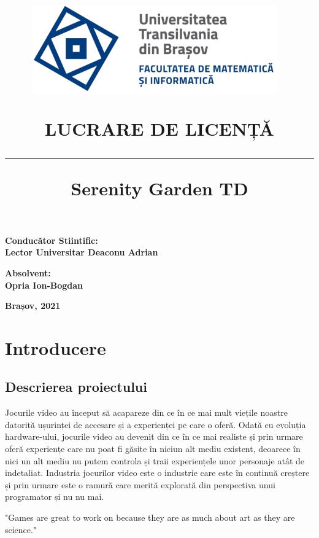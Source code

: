 \documentclass[12pt, a4paper]{article}
\title{%
	\includegraphics[height=0.3\textwidth]{UNITBV2.png}~ 
	\\[1cm]
	\vspace{20mm}
	
	\bf 	LUCRARE DE LICENȚĂ
	\noindent\rule{14cm}{1pt}
	\bf Serenity Garden TD
}
\date{}
\begin{document}
	
	
	
	\maketitle
	\vspace{10mm} %
	\begin{flushleft}
		\bf 	Conducător Stiintific:
		\bf     \\Lector Universitar Deaconu Adrian
	\end{flushleft}
	
	\begin{flushright}
		\bf Absolvent:
		\bf \\Opria Ion-Bogdan
	\end{flushright}
	
	\vspace{6mm} %
	
	\begin{center}
		\bf Brașov, 2021 
	\end{center}
	
	
	\tableofcontents
	\pagebreak
	
	\section{Introducere}
	
	
	
	
	
	\subsection{Descrierea proiectului}
	
	Jocurile video au început să acapareze din ce în ce mai mult viețile noastre datorită ușurinței de accesare și a experienței pe care o oferă. Odată cu evoluția hardware-ului, jocurile video au devenit din ce în ce mai realiste și prin urmare oferă experiențe care nu poat fi găsite în niciun alt mediu existent, deoarece în nici un alt mediu nu putem controla și traii experiențele unor personaje atât de indetaliat. Industria jocurilor video este o industrie care este în continuă creștere și prin urmare este o ramură care merită explorată din perspectiva unui programator și nu nu mai. 
	\newline
	
	"Games are great to work on because they are as much about art as they are science." \cite{gameProgrammingComplete}
	\newline
	
\end{document}
